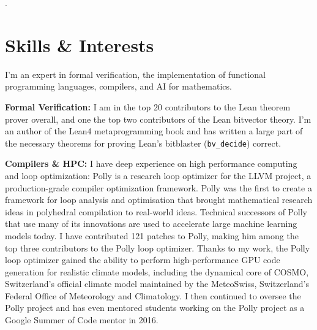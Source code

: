 \documentclass[11pt,a4paper,sans,colorlinks]{moderncv}        %
\begin{document}


.


\section{Skills \& Interests}

I'm an expert in formal verification, the implementation of functional programming languages, compilers, and AI for mathematics.

\textbf{Formal Verification:}
I am in the top 20 contributors to the Lean theorem prover overall, and one the top two contributors of the Lean bitvector theory.
I'm an author of the Lean4 metaprogramming book and has written a large part of the necessary theorems for proving
Lean's bitblaster (\texttt{bv\_decide}) correct.

\textbf{Compilers \& HPC:} I have deep experience on high performance computing and loop optimization: Polly is a research loop optimizer for the LLVM project, a production-grade compiler optimization framework. Polly was the first to create a framework for loop analysis and optimisation that brought mathematical research ideas in polyhedral compilation to real-world ideas. Technical successors of Polly that use many of its innovations are used to accelerate large machine learning models today. I have contributed 121 patches to Polly, making him among the top three contributors to the Polly loop optimizer. Thanks to my work, the Polly loop optimizer gained the ability to perform high-performance GPU code generation for realistic climate models, including the dynamical core of COSMO, Switzerland's official climate model maintained by the MeteoSwiss, Switzerland's Federal Office of Meteorology and Climatology. I then continued to oversee the Polly project and has even mentored students working on the Polly project as a Google Summer of Code mentor in 2016.
\end{document}
